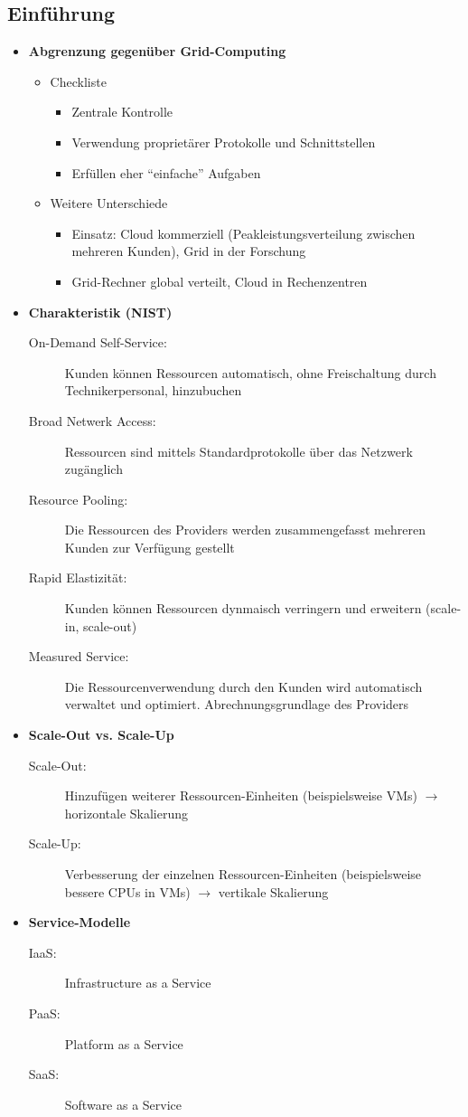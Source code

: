 \subsection{Einführung}
\begin{itemize}
	\item \textbf{Abgrenzung gegenüber Grid-Computing}
	\begin{itemize}
		\item Checkliste
		\begin{itemize}
			\item Zentrale Kontrolle
			\item Verwendung proprietärer Protokolle und Schnittstellen
			\item Erfüllen eher "`einfache"' Aufgaben
		\end{itemize}
		\item Weitere Unterschiede
		\begin{itemize}
			\item Einsatz: Cloud kommerziell (Peakleistungsverteilung zwischen mehreren Kunden), Grid in der Forschung
			\item Grid-Rechner global verteilt, Cloud in Rechenzentren
		\end{itemize}
	\end{itemize}
	\item \textbf{Charakteristik (NIST)}
	\begin{description}
		\item[On-Demand Self-Service:] Kunden können Ressourcen automatisch, ohne Freischaltung durch Technikerpersonal, hinzubuchen
		\item[Broad Netwerk Access:] Ressourcen sind mittels Standardprotokolle über das Netzwerk zugänglich
		\item[Resource Pooling:] Die Ressourcen des Providers werden zusammengefasst mehreren Kunden zur Verfügung gestellt
		\item[Rapid Elastizität:] Kunden können Ressourcen dynmaisch verringern und erweitern (scale-in, scale-out)
		\item[Measured Service:] Die Ressourcenverwendung durch den Kunden wird automatisch verwaltet und optimiert. Abrechnungsgrundlage des Providers
	\end{description}
	\item \textbf{Scale-Out vs. Scale-Up}
	\begin{description}
		\item[Scale-Out:] Hinzufügen weiterer Ressourcen-Einheiten (beispielsweise VMs) \(\rightarrow\) horizontale Skalierung
		\item[Scale-Up:] Verbesserung der einzelnen Ressourcen-Einheiten (beispielsweise bessere CPUs in VMs) \(\rightarrow\) vertikale Skalierung
	\end{description}
	\item \textbf{Service-Modelle}
	\begin{description}
		\item[IaaS:] Infrastructure as a Service
		\item[PaaS:] Platform as a Service
		\item[SaaS:] Software as a Service
	\end{description}
\end{itemize}


